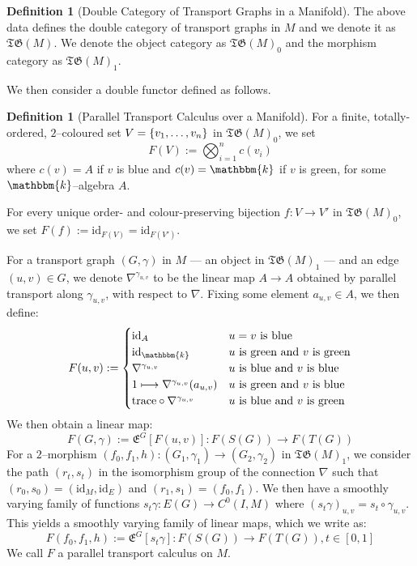 \documentclass{amsart}
\newcommand{\K}{\mathbbm{k}}
\renewcommand{\to}[1][]{\stackrel{#1}{\longrightarrow}}
\renewcommand{\mapsto}{\longmapsto}
\newcommand{\id}{\text{id}}
\newcommand{\curly}[1]{\left\{ #1 \right\}}
\newcommand{\set}[2][]{\ifthenelse{\equal{#1}{}}
                                  {\curly{#2}}
                                  {\curly{#1\ \textbf{:}\ #2}}}
\newcommand{\TG}{\mathfrak{TG}}
\newcommand{\Exp}[1]{\mathfrak{E}^{#1}}
\numberwithin{thm}{section}
\theoremstyle{definition}
\newtheorem{defn}[thm]{Definition}
\begin{document}
\begin{defn}[Double Category of Transport Graphs in a Manifold]
The above data defines the double category of transport graphs in $M$ and we
denote it as $\TG(M)$. We denote the object category as $\TG(M)_0$ and the
morphism category as $\TG(M)_1$.
\end{defn}

We then consider a double functor defined as follows.

\begin{defn}[Parallel Transport Calculus over a Manifold]\label{defn:sing_man_tqft}
For a finite, totally-ordered, $2$--coloured set
$V = \set{v_1, \dots, v_n}$ in $\TG(M)_0$, we set
\[
  F(V) := \bigotimes_{i = 1}^{n} c(v_i)
\]
where $c(v) = A$ if $v$ is blue and $c(v) = \K$ if $v$ is green,
for some $\K$--algebra $A$.

For every unique order- and colour-preserving bijection $f : V \to V'$ in
$\TG(M)_0$, we set $F(f) := \id_{F(V)} = \id_{F(V')}$.

For a transport graph $(G, \gamma)$ in $M$ --- an object in $\TG(M)_1$ --- and an
edge $(u, v) \in G$, we denote $\nabla^{\gamma_{u, v}}$ to be the linear map
$A \to A$ obtained by parallel transport along $\gamma_{u, v}$, with respect to
$\nabla$. Fixing some element $a_{u, v} \in A$, we then define:
\[
  F(u, v) := \begin{cases}
    \id_A
      & u = v \text{ is blue} \\
    \id_{\K} 
      & u \text{ is green and } v \text{ is green} \\
    \nabla^{\gamma_{u, v}}
      & u \text{ is blue and } v \text{ is blue} \\
    1 \mapsto \nabla^{\gamma_{u, v}}(a_{u, v})
      & u \text{ is green and } v \text{ is blue} \\
    \text{trace} \circ \nabla^{\gamma_{u, v}}
      & u \text{ is blue and } v \text{ is green}
  \end{cases}
\]
We then obtain a linear map:
\[
  F(G, \gamma) := \Exp{G}[F(u, v)]
               :  F(S(G)) \to F(T(G))
\]
For a $2$--morphism
$(f_0, f_1, h) : (G_1, \gamma_1) \to (G_2, \gamma_2)$ in $\TG(M)_1$, we consider
the path $(r_t, s_t)$ in the isomorphism group of the connection $\nabla$ such
that $(r_0, s_0) = (\id_M, \id_E)$ and $(r_1, s_1) = (f_0, f_1)$. We then have a
smoothly varying family of functions $s_t\gamma : E(G) \to C^0(I, M)$
where $(s_t\gamma)_{u, v} = s_t \circ \gamma_{u, v}$. This yields a smoothly
varying family of linear maps, which we write as:
\[
  F(f_0, f_1, h) := \Exp{G}[s_t\gamma]
    : F(S(G)) \to F(T(G)), t \in [0, 1]
\]
We call $F$ a parallel transport calculus on $M$.
\end{defn}
\end{document}

